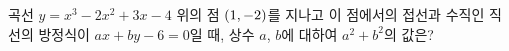 곡선 $y=x^3-2x^2+3x-4$ 위의 점 $(1{,}\mkern3mu\mathopen{}-2)$를 지나고 이 점에서의 접선과 수직인 직선의 방정식이 $ax+by-6=0$일 때, 상수 $a$, $b$에 대하여 $a^2+b^2$의 값은?
